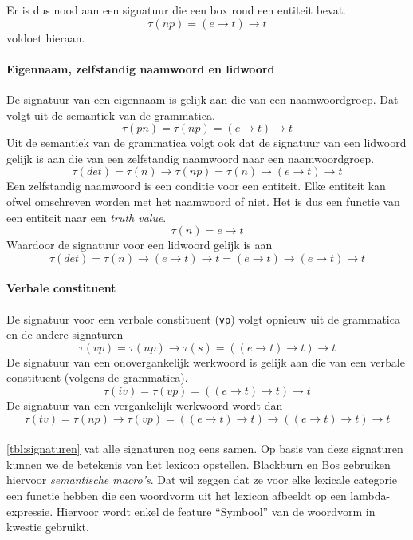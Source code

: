 Er is dus nood aan een signatuur die een box rond een entiteit bevat. $$\tau(np) = (e \rightarrow t) \rightarrow t$$ voldoet hieraan.

\paragraph{Eigennaam, zelfstandig naamwoord en lidwoord} De signatuur van een eigennaam is gelijk aan die van een naamwoordgroep. Dat volgt uit de semantiek van de grammatica. $$\tau(pn) = \tau(np) = (e \rightarrow t) \rightarrow t$$ Uit de semantiek van de grammatica volgt ook dat de signatuur van een lidwoord gelijk is aan die van een zelfstandig naamwoord naar een naamwoordgroep. $$ \tau(det) = \tau(n) \rightarrow \tau(np) = \tau(n) \rightarrow (e \rightarrow t) \rightarrow t$$ Een zelfstandig naamwoord is een conditie voor een entiteit. Elke entiteit kan ofwel omschreven worden met het naamwoord of niet. Het is dus een functie van een entiteit naar een \textit{truth value}. $$\tau(n) = e \rightarrow t$$ Waardoor de signatuur voor een lidwoord gelijk is aan $$ \tau(det) = \tau(n) \rightarrow (e \rightarrow t) \rightarrow t = (e \rightarrow t) \rightarrow (e \rightarrow t) \rightarrow t $$

\paragraph{Verbale constituent} De signatuur voor een verbale constituent (\texttt{vp}) volgt opnieuw uit de grammatica en de andere signaturen $$\tau(vp) = \tau(np) \rightarrow \tau(s) = ((e \rightarrow t) \rightarrow t) \rightarrow t$$ De signatuur van een onovergankelijk werkwoord is gelijk aan die van een verbale constituent (volgens de grammatica). $$\tau(iv) = \tau(vp) = ((e \rightarrow t) \rightarrow t) \rightarrow t$$ De signatuur van een vergankelijk werkwoord wordt dan $$\tau(tv) = \tau(np) \rightarrow \tau(vp) = ((e \rightarrow t) \rightarrow t) \rightarrow ((e \rightarrow t) \rightarrow t) \rightarrow t$$

\paragraph{} \autoref{tbl:signaturen} vat alle signaturen nog eens samen. Op basis van deze signaturen kunnen we de betekenis van het lexicon opstellen. Blackburn en Bos gebruiken hiervoor \textit{semantische macro's}. Dat wil zeggen dat ze voor elke lexicale categorie een functie hebben die een woordvorm uit het lexicon afbeeldt op een lambda-expressie. Hiervoor wordt enkel de feature ``Symbool'' van de woordvorm in kwestie gebruikt.

